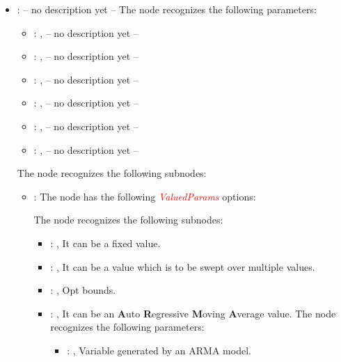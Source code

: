 \begin{itemize}
\begin{itemize}
        \item {}:
          -- no description yet --
          The  node recognizes the following parameters:
            \begin{itemize}
              \item {}: , 
                -- no description yet --
              \item {}: , 
                -- no description yet --
              \item {}: , 
                -- no description yet --
              \item {}: , 
                -- no description yet --
              \item {}: , 
                -- no description yet --
              \item {}: , 
                -- no description yet --
          \end{itemize}

          The  node recognizes the following subnodes:
          \begin{itemize}
            \item {}:
              The node  has the following \textcolor{red}{\textit{ValuedParams}}
              options:

              The  node recognizes the following subnodes:
              \begin{itemize}
                \item {}: , 
                  It can be a fixed value.

                \item {}: , 
                  It can be a value which is to be swept over multiple values.

                \item {}: , 
                  Opt bounds.

                \item {}: , 
                  It can be an \textbf{A}uto \textbf{R}egressive \textbf{M}oving \textbf{A}verage
                  value.
                  The  node recognizes the following parameters:
                    \begin{itemize}
                      \item {}: , 
                        Variable generated by an ARMA model.
                  \end{itemize}


\end{itemize}
\end{itemize}
\end{itemize}
\end{itemize}
